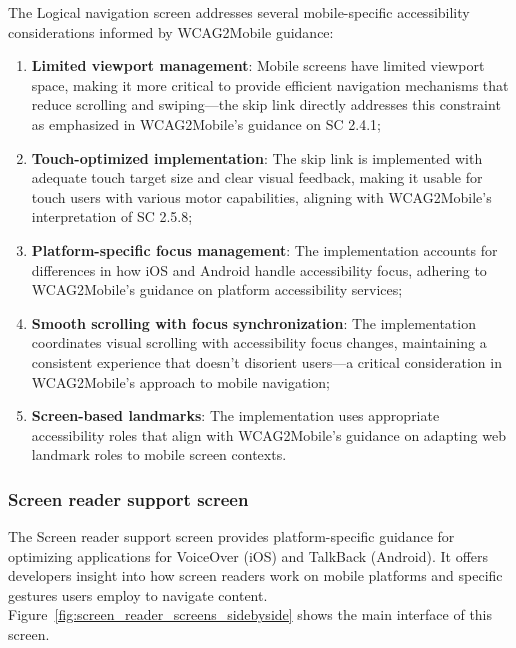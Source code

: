 The Logical navigation screen addresses several mobile-specific accessibility considerations informed by WCAG2Mobile guidance:

\begin{enumerate}
    \item \textbf{Limited viewport management}: Mobile screens have limited viewport space, making it more critical to provide efficient navigation mechanisms that reduce scrolling and swiping—the skip link directly addresses this constraint as emphasized in WCAG2Mobile's guidance on SC 2.4.1;
    
    \item \textbf{Touch-optimized implementation}: The skip link is implemented with adequate touch target size and clear visual feedback, making it usable for touch users with various motor capabilities, aligning with WCAG2Mobile's interpretation of SC 2.5.8;
    
    \item \textbf{Platform-specific focus management}: The implementation accounts for differences in how iOS and Android handle accessibility focus, adhering to WCAG2Mobile's guidance on platform accessibility services;
    
    \item \textbf{Smooth scrolling with focus synchronization}: The implementation coordinates visual scrolling with accessibility focus changes, maintaining a consistent experience that doesn't disorient users—a critical consideration in WCAG2Mobile's approach to mobile navigation;
    
    \item \textbf{Screen-based landmarks}: The implementation uses appropriate accessibility roles that align with WCAG2Mobile's guidance on adapting web landmark roles to mobile screen contexts.
\end{enumerate}

\subsubsection{Screen reader support screen}
\label{subsubsec:screen-reader-support}

The Screen reader support screen provides platform-specific guidance for optimizing applications for VoiceOver (iOS) and TalkBack (Android). It offers developers insight into how screen readers work on mobile platforms and specific gestures users employ to navigate content. Figure~\ref{fig:screen_reader_screens_sidebyside} shows the main interface of this screen.

